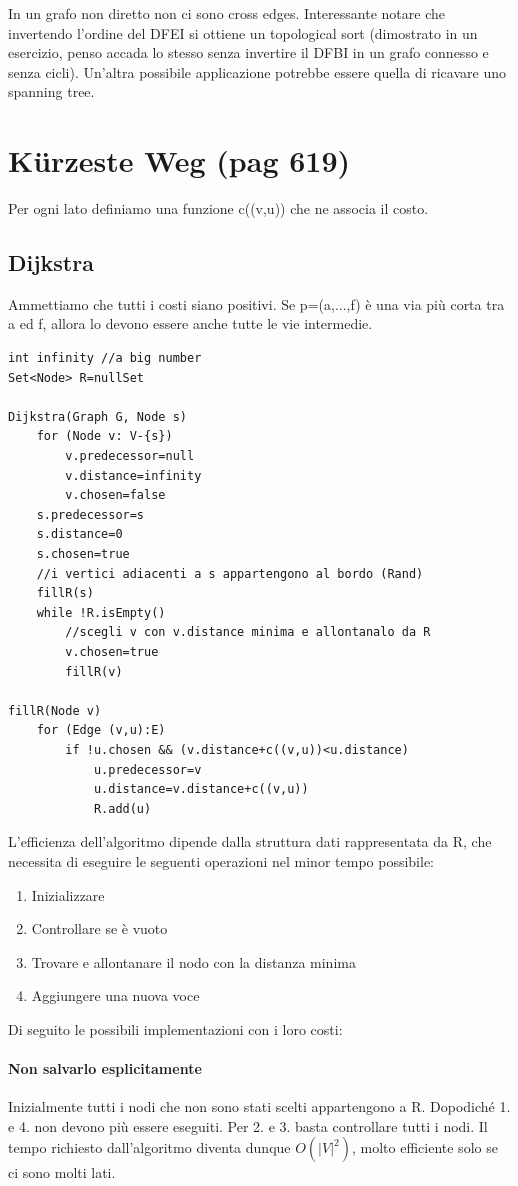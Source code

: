 \documentclass[a4paper]{book}
\begin{document}
In un grafo non diretto non ci sono cross edges. Interessante notare che invertendo l'ordine del DFEI si ottiene un topological sort (dimostrato in un esercizio, penso accada lo stesso senza invertire il DFBI in un grafo connesso e senza cicli). Un'altra possibile applicazione potrebbe essere quella di ricavare uno spanning tree. 
\section{Kürzeste Weg (pag 619)}
Per ogni lato definiamo una funzione c((v,u)) che ne associa il costo.
\subsection{Dijkstra}
Ammettiamo che tutti i costi siano positivi. Se p=(a,...,f) è una via più corta tra a ed f, allora lo devono essere anche tutte le vie intermedie.
\begin{lstlisting}
int infinity //a big number
Set<Node> R=nullSet
	
Dijkstra(Graph G, Node s)
	for (Node v: V-{s})
		v.predecessor=null
		v.distance=infinity
		v.chosen=false	
	s.predecessor=s
	s.distance=0
	s.chosen=true
	//i vertici adiacenti a s appartengono al bordo (Rand)
	fillR(s)
	while !R.isEmpty()
		//scegli v con v.distance minima e allontanalo da R
		v.chosen=true
		fillR(v)
		
fillR(Node v)
	for (Edge (v,u):E)
		if !u.chosen && (v.distance+c((v,u))<u.distance)
			u.predecessor=v
			u.distance=v.distance+c((v,u))
			R.add(u)				
\end{lstlisting}
L'efficienza dell'algoritmo dipende dalla struttura dati rappresentata da R, che necessita di eseguire le seguenti operazioni nel minor tempo possibile:
\begin{enumerate}
\item Inizializzare
\item Controllare se è vuoto
\item Trovare e allontanare il nodo con la distanza minima
\item Aggiungere una nuova voce
\end{enumerate}
Di seguito le possibili implementazioni con i loro costi:
\paragraph*{Non salvarlo esplicitamente}
Inizialmente tutti i nodi che non sono stati scelti appartengono a R. Dopodiché 1. e 4. non devono più essere eseguiti. Per 2. e 3. basta controllare tutti i nodi. Il tempo richiesto dall'algoritmo diventa dunque $O(|V|^2)$, molto efficiente solo se ci sono molti lati.
\end{document}
